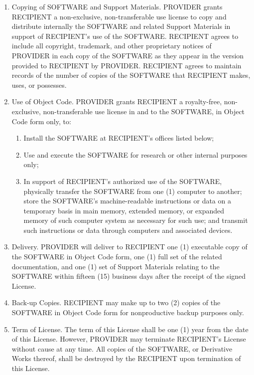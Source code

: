 \begin{enumerate}
\item Copying of SOFTWARE and Support Materials.  PROVIDER grants
RECIPIENT a non-exclusive, non-transferable use license to copy and
distribute internally the SOFTWARE and related Support Materials in
support of RECIPIENT's use of the SOFTWARE.  RECIPIENT agrees to
include all copyright, trademark, and other proprietary notices of
PROVIDER in each copy of the SOFTWARE as they appear in the version
provided to RECIPIENT by PROVIDER.  RECIPIENT agrees to maintain
records of the number of copies of the SOFTWARE that RECIPIENT makes,
uses, or possesses. 

\item Use of Object Code.  PROVIDER grants RECIPIENT a royalty-free,
non-exclusive, non-transferable use license in and to the SOFTWARE, in
Object Code form only, to: 
  \begin{enumerate}
  \item Install the SOFTWARE at RECIPIENT's offices listed below;
  \item Use and execute the SOFTWARE for research or other internal
  purposes only;
  \item In support of RECIPIENT's authorized use of the SOFTWARE,
  physically transfer the SOFTWARE from one (1) computer to another;
  store the SOFTWARE's machine-readable instructions or data on a
  temporary basis in main memory, extended memory, or expanded memory
  of such computer system as necessary for such use; and transmit such
  instructions or data through computers and associated devices.
  \end{enumerate}

\item Delivery.  PROVIDER will deliver to RECIPIENT one (1) executable
copy of the SOFTWARE in Object Code form, one (1) full set of the
related documentation, and one (1)
set of Support Materials relating to the SOFTWARE within fifteen (15)
business days after the receipt of the signed License. 

\item Back-up Copies.  RECIPIENT may make up to two (2) copies of the
SOFTWARE in Object Code form for nonproductive backup purposes only. 

\item Term of License.  The term of this License shall be one (1) year
from the date of this License.  However, PROVIDER may terminate
RECIPIENT's License without cause at any time.  All copies of the
SOFTWARE, or Derivative Works thereof, shall be destroyed by the
RECIPIENT upon termination of this License.   


\end{enumerate}
